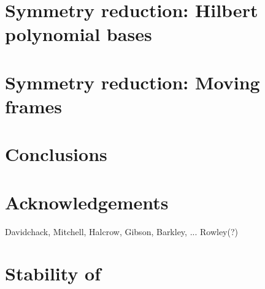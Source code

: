 \documentclass[preprint,number,sort&compress]{elsarticle}
\begin{document}
   
   

\section{\label{s:Hilbert} Symmetry reduction: Hilbert polynomial bases}
    
    

\section{\label{sec:mf} Symmetry reduction: Moving frames}
    
    
    
    


\section{Conclusions}
    

\section*{Acknowledgements}
 Davidchack, Mitchell, Halcrow, Gibson, Barkley, ... Rowley(?)

\appendix*

\section{\label{s:StabReq} Stability of \reqva}
    

% 



    \newpage
    
    
\end{document}
